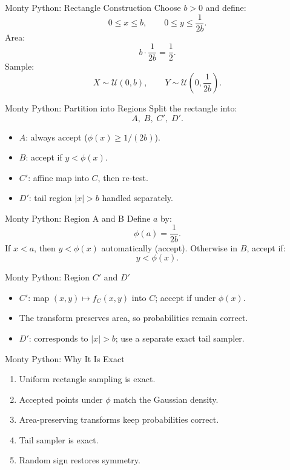 \documentclass[aspectratio=169]{beamer}
\begin{document}
\begin{frame}{Monty Python: Rectangle Construction}
\small
Choose $b>0$ and define:
\[
0\le x\le b,\qquad 0\le y\le \frac{1}{2b}.
\]
Area:
\[
b\cdot\frac{1}{2b}=\frac12.
\]
Sample:
\[
X\sim \mathcal{U}(0,b),\qquad
Y\sim \mathcal{U}\!\left(0,\frac{1}{2b}\right).
\]
\end{frame}

\begin{frame}{Monty Python: Partition into Regions}
\small
Split the rectangle into:
\[
A,\;B,\;C',\;D'.
\]
\begin{itemize}
  \item $A$: always accept ($\phi(x)\ge 1/(2b)$).
  \item $B$: accept if $y<\phi(x)$.
  \item $C'$: affine map into $C$, then re-test.
  \item $D'$: tail region $|x|>b$ handled separately.
\end{itemize}
\end{frame}

\begin{frame}{Monty Python: Region A and B}
\small
Define $a$ by:
\[
\phi(a)=\frac{1}{2b}.
\]
If $x<a$, then $y<\phi(x)$ automatically (accept).
\vspace{0.4em}
Otherwise in $B$, accept if:
\[
y<\phi(x).
\]
\end{frame}

\begin{frame}{Monty Python: Region $C'$ and $D'$}
\small
\begin{itemize}
  \item $C'$: map $(x,y)\mapsto f_C(x,y)$ into $C$; accept if under $\phi(x)$.
  \item The transform preserves area, so probabilities remain correct.
  \item $D'$: corresponds to $|x|>b$; use a separate exact tail sampler.
\end{itemize}
\end{frame}


\begin{frame}{Monty Python: Why It Is Exact}
\small
\begin{enumerate}
  \item Uniform rectangle sampling is exact.
  \item Accepted points under $\phi$ match the Gaussian density.
  \item Area-preserving transforms keep probabilities correct.
  \item Tail sampler is exact.
  \item Random sign restores symmetry.
\end{enumerate}
\end{frame}
\end{document}

